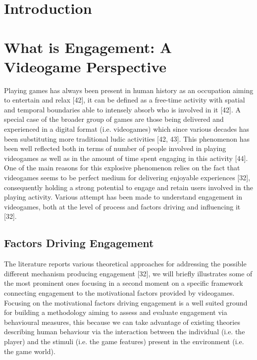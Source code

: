 \section{Introduction}
\label{motivation_engagement_introduction}

\section{What is Engagement: A Videogame Perspective}
\label{engagement}
Playing games has always been present in human history as an occupation aiming to entertain and relax [42], it can be defined as a free-time activity with spatial and temporal boundaries able to intensely absorb who is involved in it [42]. A special case of the broader group of games are those being delivered and experienced in a digital format (i.e. videogames) which since various decades has been substituting more traditional ludic activities [42, 43]. This phenomenon has been well reflected both in terms of number of people involved in playing videogames as well as in the amount of time spent engaging in this activity [44]. One of the main reasons for this explosive phenomenon relies on the fact that videogames seems to be perfect medium for delivering enjoyable experiences [32], consequently holding a strong potential to engage and retain users involved in the playing activity. Various attempt has been made to understand engagement in videogames, both at the level of process and factors driving and influencing it [32].

\subsection{Factors Driving Engagement}
\label{factors_engagement}
The literature reports various theoretical approaches  for addressing the possible different mechanism producing engagement [32], we will briefly illustrates some of the most prominent ones focusing in a second moment on a specific framework connecting engagement to the motivational factors provided by videogames. Focusing on the motivational factors driving engagement is a well suited ground for building a methodology aiming to assess and evaluate engagement via behavioural measures, this because we can take advantage of existing theories describing human behaviour via the interaction between the individual (i.e. the player) and the stimuli (i.e. the game features) present in the environment (i.e. the game world).

